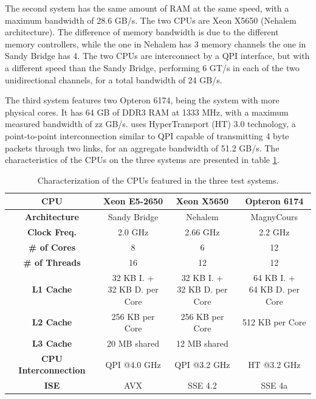 The second system has the same amount of RAM at the same speed, with a maximum bandwidth of 28.6 GB/s. The two CPUs are \intel Xeon X5650 (Nehalem architecture). The difference of memory bandwidth is due to the different memory controllers, while the one in Nehalem has 3 memory channels the one in Sandy Bridge has 4. The two CPUs are interconnect by a QPI interface, but with a different speed than the Sandy Bridge, performing 6 GT/s in each of the two unidirectional channels, for a total bandwidth of 24 GB/s.

The third system features two \amd Opteron 6174, being the system with more physical cores. It has 64 GB of DDR3 RAM at 1333 MHz, with a maximum measured bandwidth of zz GB/s. \amd uses HyperTransport (HT) 3.0 technology, a point-to-point interconnection similar to QPI capable of transmitting 4 byte packets through two links, for an aggregate bandwidth of 51.2 GB/s. The characteristics of the CPUs on the three systems are presented in table \ref{tab:CPUS}.

\begin{table}[!htp]
	\begin{center}
		\begin{tabular}{|c|c|c|c|}
			\hline
			\textbf{CPU} & \intel Xeon E5-2650 & \intel Xeon X5650 & \amd Opteron 6174 \\ \hline
			\textbf{Architecture} & Sandy Bridge & Nehalem & Magny\-Cours \\ \hline
			\textbf{Clock Freq.} & 2.0 GHz & 2.66 GHz & 2.2 GHz \\ \hline
			\textbf{\# of Cores} & 8 & 6 & 12 \\ \hline
			\textbf{\# of Threads} & 16 & 12 & 12 \\ \hline
			\textbf{L1 Cache} & \specialcell{32 KB I. +\\32 KB D. per Core} & \specialcell{32 KB I. +\\32 KB D. per Core} & \specialcell{64 KB I. +\\64 KB D. per Core} \\ \hline
			\textbf{L2 Cache} & 256 KB per Core & 256 KB per Core & 512 KB per Core \\ \hline
			\textbf{L3 Cache} & 20 MB shared & 12 MB shared & \- \\ \hline
			\textbf{CPU Interconnection} & QPI @4.0 GHz & QPI @3.2 GHz & HT @3.2 GHz \\ \hline
			\textbf{ISE} & AVX & SSE 4.2 & SSE 4a \\
			\hline
		\end{tabular}
		\caption{Characterization of the CPUs featured in the three test systems.}
		\label{tab:CPUS}
	\end{center}
\end{table}

